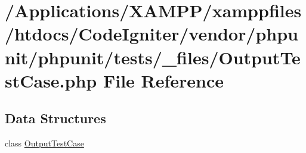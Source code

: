 \hypertarget{_output_test_case_8php}{}\section{/\+Applications/\+X\+A\+M\+P\+P/xamppfiles/htdocs/\+Code\+Igniter/vendor/phpunit/phpunit/tests/\+\_\+files/\+Output\+Test\+Case.php File Reference}
\label{_output_test_case_8php}
\subsection*{Data Structures}
\begin{DoxyCompactItemize}
\item 
class \mbox{\hyperlink{class_output_test_case}{Output\+Test\+Case}}
\end{DoxyCompactItemize}
